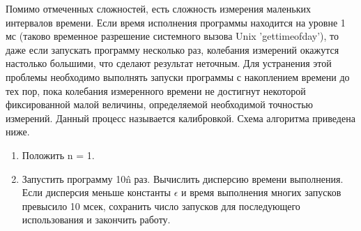 Помимо отмеченных сложностей, есть сложность измерения маленьких интервалов времени. Если время исполнения программы находится на уровне 1 мс (таково временное разрешение системного вызова Unix 'gettimeofday'), то даже если запускать программу несколько раз, колебания измерений окажутся настолько большими, что сделают результат неточным. Для устранения этой проблемы необходимо выполнять запуски программы с накоплением времени до тех пор, пока колебания измеренного времени не достигнут некоторой фиксированной малой величины, определяемой необходимой точностью измерений. Данный процесс называется калибровкой. Схема алгоритма приведена ниже.

\begin{enumerate}
	\item Положить n = 1.
	\item Запустить программу 10\^n раз. Вычислить дисперсию времени выполнения. Если дисперсия меньше константы $\epsilon$ и время выполнения многих запусков превысило 10 мсек, сохранить число запусков для последующего использования и закончить работу.
\end{enumerate}


